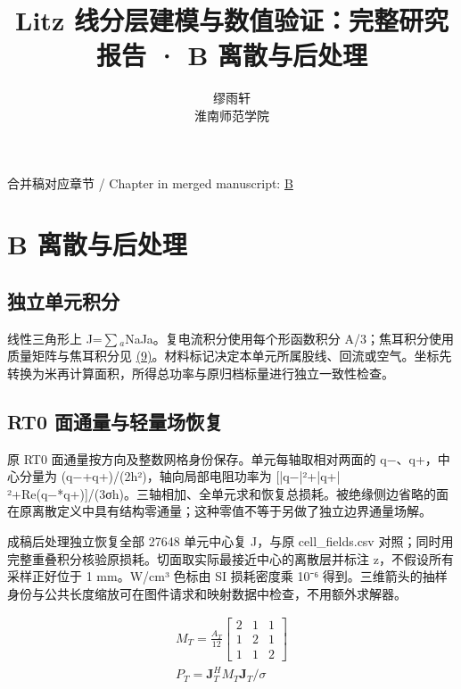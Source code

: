 \documentclass[11pt]{article}
\begin{document}
\title{Litz 线分层建模与数值验证：完整研究报告 · B 离散与后处理}
\author{缪雨轩\\淮南师范学院}
\date{}
\maketitle
\noindent 合并稿对应章节 / Chapter in merged manuscript: \href{report_zh-CN_single.pdf#chapter-B}{B}\par
\FloatBarrier
\section*{B 离散与后处理}
\hypertarget{chapter-B}{}
\subsection*{独立单元积分}
\hypertarget{B.triangle_derivation.heading}{}
线性三角形上 J=\(\sum\)\(_a\)NaJa。复电流积分使用每个形函数积分 A/3；焦耳积分使用质量矩阵与焦耳积分见 \href{report_zh-CN_single.pdf#E09}{(9)}。材料标记决定本单元所属股线、回流或空气。坐标先转换为米再计算面积，所得总功率与原归档标量进行独立一致性检查。


\subsection*{RT0 面通量与轻量场恢复}
\hypertarget{B.report_rt0.heading}{}
原 RT0 面通量按方向及整数网格身份保存。单元每轴取相对两面的 q−、q+，中心分量为 (q−+q+)/(2h²)，轴向局部电阻功率为 [|q−|²+|q+|²+Re(q−*q+)]/(3σh)。三轴相加、全单元求和恢复总损耗。被绝缘侧边省略的面在原离散定义中具有结构零通量；这种零值不等于另做了独立边界通量场解。


成稿后处理独立恢复全部 27648 单元中心复 J，与原 cell\_fields.csv 对照；同时用完整重叠积分核验原损耗。切面取实际最接近中心的离散层并标注 z，不假设所有采样正好位于 1 mm。W/cm³ 色标由 SI 损耗密度乘 10⁻⁶ 得到。三维箭头的抽样身份与公共长度缩放可在图件请求和映射数据中检查，不用额外求解器。


\hypertarget{E09}{}
\begin{equation}
\begin{gathered}
M_T=\frac{A_T}{12}\begin{bmatrix}2&1&1\\1&2&1\\1&1&2\end{bmatrix} \\
P_T=\mathbf J_T^H M_T\mathbf J_T/\sigma
\end{gathered}
\tag{9}\label{eq:E09}
\end{equation}
\end{document}
